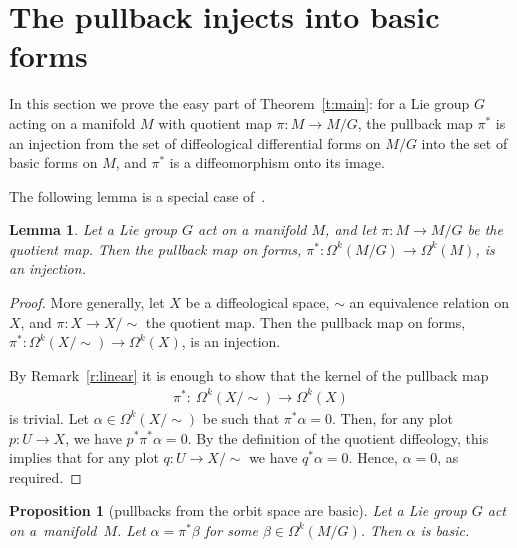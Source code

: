\documentclass[11pt]{article}
\numberwithin{equation}{section}
\newtheorem{Lemma}[Theorem]{Lemma}
\newtheorem{Proposition}[Theorem]{Proposition}
\newcommand{\hypref}[2]{{#2~\ref{#1}}}
\begin{document}
\section{The pullback injects into basic forms}\label{sec:injects}

In this section we prove the easy part of Theorem~\ref{t:main}:
for a Lie group $G$ acting on a manifold $M$
with quotient map $\pi \colon M \to M/G$,
the pullback map $\pi^*$ is an injection
from the set of dif\/feological dif\/ferential forms on $M/G$
into the set of basic forms on $M$,
and $\pi^*$ is a dif\/feomorphism onto its image.

The following lemma is a special case of~\cite[Section~6.39]{iglesias}.

\begin{Lemma} \label{l:pullback is injection}
Let a Lie group $G$ act on a manifold $M$,
and let $\pi \colon M \to M/G$ be the quotient map.
Then the pullback map on forms,
$\pi^* \colon \Omega^k(M/G) \to \Omega^k(M)$, is an injection.
\end{Lemma}



\begin{proof}
More generally, let $X$ be a dif\/feological space, $\sim$ an equivalence
relation on $X$, and $\pi \colon X \to X/\!\!\sim$ the quotient map.
Then the pullback map on forms,
$\pi^* \colon \Omega^k(X/\!\!\sim) \to \Omega^k(X)$, is an injection.

By \hypref{r:linear}{Remark} it is enough to show that
the kernel of the pullback map
\begin{gather*}\pi^* \colon \ \Omega^k(X/\!\!\sim) \to \Omega^k(X)\end{gather*}
is trivial.
Let $\alpha \in \Omega^k(X/\!\!\sim)$
be such that $\pi^* \alpha = 0$.
Then, for any plot $p \colon U \to X$, we have $p^* \pi^* \alpha= 0$.
By the def\/inition of the quotient dif\/feology, this implies that
for any plot $q \colon U \to X/\!\!\sim$ we have $q^* \alpha = 0$.
Hence, $\alpha = 0$, as required.
\end{proof}

\begin{Proposition}[pullbacks from the orbit space are basic]
\label{p:pullbacksarebasic}
Let a Lie group $G$ act on a~mani\-fold~$M$.
Let $\alpha = \pi^*\beta$ for some $\beta \in \Omega^k(M/G)$.
Then $\alpha$ is basic.
\end{Proposition}
\end{document}
